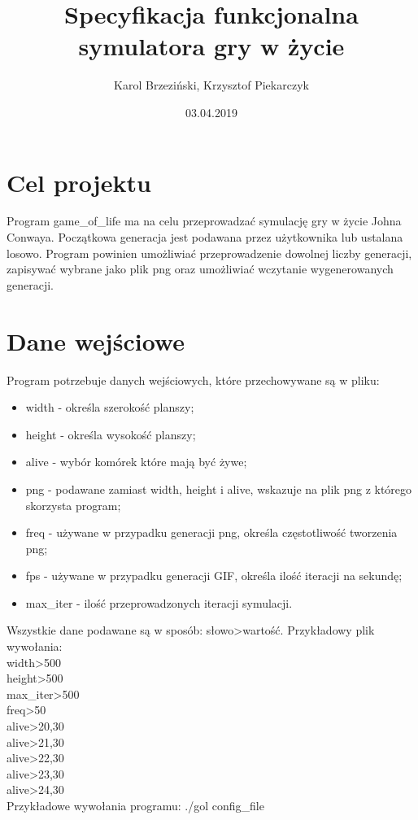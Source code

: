 \documentclass[12pt]{article}
\title{Specyfikacja funkcjonalna symulatora gry w życie}
\author{Karol Brzeziński, Krzysztof Piekarczyk}
\date{03.04.2019}
\begin{document}
\maketitle

\section{Cel projektu}

 Program game\_of\_life ma na celu przeprowadzać symulację gry w życie Johna Conwaya. Początkowa generacja jest podawana przez użytkownika lub ustalana losowo. Program powinien umożliwiać przeprowadzenie dowolnej liczby generacji, zapisywać wybrane jako plik png oraz umożliwiać wczytanie wygenerowanych generacji.
  
\section{Dane wejściowe}

Program potrzebuje danych wejściowych, które przechowywane są w pliku:
\begin{itemize}
\item width - określa szerokość planszy;

\item height - określa wysokość planszy;

\item alive - wybór komórek które mają być żywe;

\item png - podawane zamiast width, height i alive, wskazuje na plik png z którego skorzysta program;

\item freq - używane w przypadku generacji png, określa częstotliwość tworzenia png;

\item fps - używane w przypadku generacji GIF, określa ilość iteracji na sekundę;

\item max\_iter - ilość przeprowadzonych iteracji symulacji.

\end{itemize}
Wszystkie dane podawane są w sposób: słowo\textgreater{}wartość.
Przykładowy plik wywołania:\\
width\textgreater{}500\\
height\textgreater{}500\\
max\_iter\textgreater{}500\\
freq\textgreater{}50\\
alive\textgreater{}20,30\\
alive\textgreater{}21,30\\
alive\textgreater{}22,30\\
alive\textgreater{}23,30\\
alive\textgreater{}24,30\\
Przykładowe wywołania programu:	./gol config\_file
\end{document}
